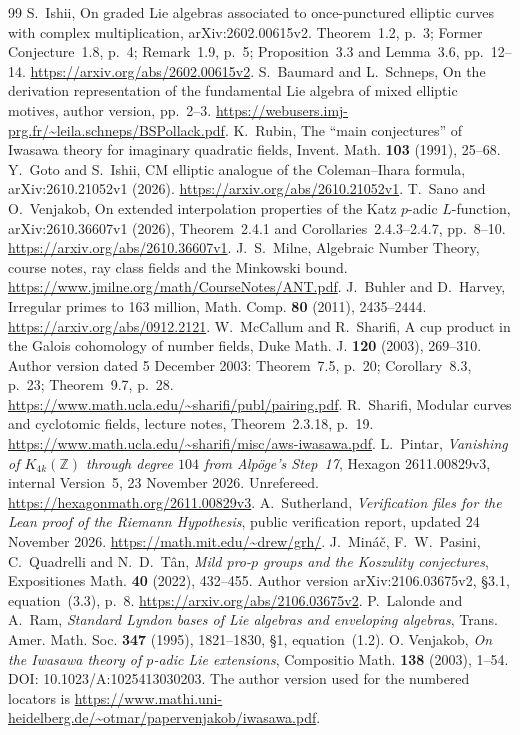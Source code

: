 \documentclass[11pt]{article}
\theoremstyle{definition}\newtheorem{definition}[theorem]{Definition}
\begin{document}
\begin{thebibliography}{99}
S.~Ishii, On graded Lie algebras associated to once-punctured elliptic curves with complex multiplication, arXiv:2602.00615v2. Theorem~1.2, p.~3; Former Conjecture~1.8, p.~4; Remark~1.9, p.~5; Proposition~3.3 and Lemma~3.6, pp.~12--14. \url{https://arxiv.org/abs/2602.00615v2}.
S.~Baumard and L.~Schneps, On the derivation representation of the fundamental Lie algebra of mixed elliptic motives, author version, pp.~2--3. \url{https://webusers.imj-prg.fr/~leila.schneps/BSPollack.pdf}.
K.~Rubin, The ``main conjectures'' of Iwasawa theory for imaginary quadratic fields, Invent. Math. \textbf{103} (1991), 25--68.
Y.~Goto and S.~Ishii, CM elliptic analogue of the Coleman--Ihara formula, arXiv:2610.21052v1 (2026). \url{https://arxiv.org/abs/2610.21052v1}.
T.~Sano and O.~Venjakob, On extended interpolation properties of the Katz $p$-adic $L$-function, arXiv:2610.36607v1 (2026), Theorem~2.4.1 and Corollaries~2.4.3--2.4.7, pp.~8--10. \url{https://arxiv.org/abs/2610.36607v1}.
J.~S.~Milne, Algebraic Number Theory, course notes, ray class fields and the Minkowski bound. \url{https://www.jmilne.org/math/CourseNotes/ANT.pdf}.
J.~Buhler and D.~Harvey, Irregular primes to 163 million, Math. Comp. \textbf{80} (2011), 2435--2444. \url{https://arxiv.org/abs/0912.2121}.
W.~McCallum and R.~Sharifi, A cup product in the Galois cohomology of number fields, Duke Math. J. \textbf{120} (2003), 269--310. Author version dated 5 December 2003: Theorem~7.5, p.~20; Corollary~8.3, p.~23; Theorem~9.7, p.~28. \url{https://www.math.ucla.edu/~sharifi/publ/pairing.pdf}.
R.~Sharifi, Modular curves and cyclotomic fields, lecture notes, Theorem~2.3.18, p.~19. \url{https://www.math.ucla.edu/~sharifi/misc/aws-iwasawa.pdf}.
L.~Pintar, \emph{Vanishing of $K_{4k}(\mathbb Z)$ through degree $104$ from Alp\"oge's Step~17}, Hexagon 2611.00829v3, internal Version~5, 23 November 2026. Unrefereed. \url{https://hexagonmath.org/2611.00829v3}.
A.~Sutherland, \emph{Verification files for the Lean proof of the Riemann Hypothesis}, public verification report, updated 24 November 2026. \url{https://math.mit.edu/~drew/grh/}.
J.~Min\'a\v c, F.~W.~Pasini, C.~Quadrelli and N.~D.~T\^an, \emph{Mild pro-$p$ groups and the Koszulity conjectures}, Expositiones Math. \textbf{40} (2022), 432--455. Author version arXiv:2106.03675v2, \S3.1, equation~(3.3), p.~8. \url{https://arxiv.org/abs/2106.03675v2}.
P.~Lalonde and A.~Ram, \emph{Standard Lyndon bases of Lie algebras and enveloping algebras}, Trans. Amer. Math. Soc. \textbf{347} (1995), 1821--1830, \S1, equation~(1.2).
O. Venjakob, \emph{On the Iwasawa theory of \(p\)-adic Lie extensions},
Compositio Math. \textbf{138} (2003), 1--54.
DOI: 10.1023/A:1025413030203.
The author version used for the numbered locators is
\url{https://www.mathi.uni-heidelberg.de/~otmar/papervenjakob/iwasawa.pdf}.


\end{thebibliography}
\end{document}
